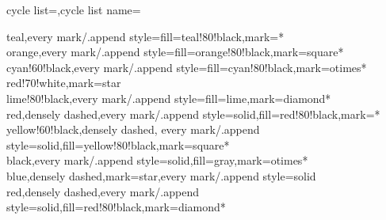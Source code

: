 \begin{pgfplotskeylist}{cycle list=,cycle list name=}
\begin{enumerate}
\begin{codeexample}
{	teal,every mark/.append style={fill=teal!80!black},mark=*\\%
	orange,every mark/.append style={fill=orange!80!black},mark=square*\\%
	cyan!60!black,every mark/.append style={fill=cyan!80!black},mark=otimes*\\%
	red!70!white,mark=star\\%
	lime!80!black,every mark/.append style={fill=lime},mark=diamond*\\%
	red,densely dashed,every mark/.append style={solid,fill=red!80!black},mark=*\\%
	yellow!60!black,densely dashed,
		every mark/.append style={solid,fill=yellow!80!black},mark=square*\\%
	black,every mark/.append style={solid,fill=gray},mark=otimes*\\%
	blue,densely dashed,mark=star,every mark/.append style=solid\\%
	red,densely dashed,every mark/.append style={solid,fill=red!80!black},mark=diamond*\\%
}
\end{codeexample}
\begin{codeexample}
\end{codeexample}
\begin{codeexample}
\end{codeexample}


\end{enumerate}
\end{pgfplotskeylist}
